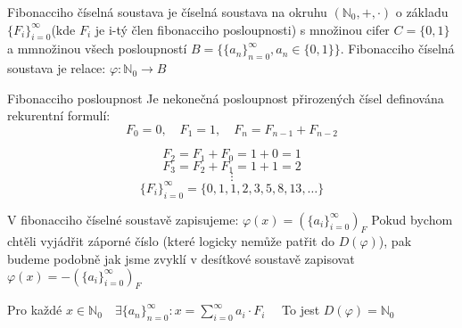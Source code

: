 \documentclass[czech,bachelor,dept470,male]{diploma}
\newcommand{\posla}{\{a_i\}_{i=0}^{\infty}}
\begin{document}
\begin{definition}
	Fibonacciho číselná soustava je číselná soustava na okruhu $(\mathbb{N}_0,+,\cdot)$ o základu $\{F_i\}_{i=0}^{\infty}$(kde $F_i$ je i-tý člen fibonacciho posloupnosti) s množinou cifer $C=\{0,1\}$ a mmnožinou všech posloupností
	$B=\{\{a_n\}_{n=0}^\infty,a_n \in \{0,1\} \}$.\newline
	Fibonacciho číselná soustava je relace:
	$\varphi:\mathbb{N}_0\to B$
\end{definition}
\begin{definition} Fibonacciho posloupnost\newline
	Je nekonečná posloupnost přirozených čísel definována rekurentní formulí:
	$$F_0 = 0,\quad F_1 = 1,\quad F_n = F_{n-1}+ F_{n-2}$$
\end{definition}
\begin{example}
	$$F_2 = F_1+F_0 =  1 + 0=1$$$$F_3 = F_2+F_1 =  1 + 1= 2$$$$\vdots$$
	$$ \{F_i\}_{i=0}^{\infty} = \{0,1,1,2,3,5,8,13,\dots\}$$
\end{example}
\begin{agreement}
	V fibonacciho číselné soustavě zapisujeme:
	$\varphi(x) =  (\posla)_F$\newline
	Pokud bychom chtěli vyjádřit záporné číslo (které logicky nemůže patřit do $D(\varphi)$), pak budeme podobně jak jsme zvyklí v desítkové soustavě zapisovat $\varphi(x) = - (\posla)_F$
\end{agreement}
\begin{theorem}
	Pro každé $x \in \mathbb{N}_0 \quad \exists\{a_n\}_{n=0}^\infty:x=\sum_{i=0}^{\infty}a_i\cdot F_i\quad$ To jest $D(\varphi)=\mathbb{N}_0$
\end{theorem}
\end{document}
